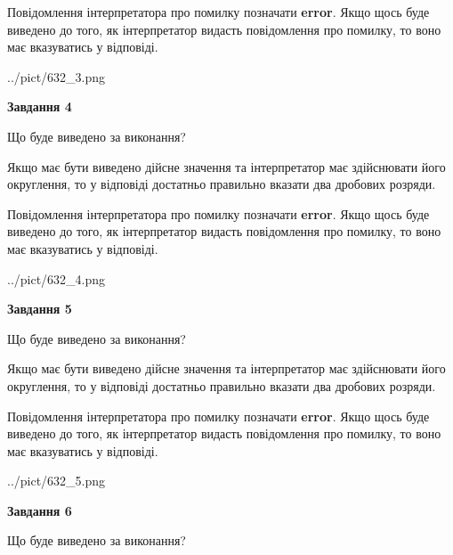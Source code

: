 \documentclass[12pt, ukrainian]{article}
\begin{document}
{\begin {Large}
Повідомлення інтерпретатора про помилку позначати \textbf{error}.
Якщо щось буде виведено до того, як інтерпретатор видасть повідомлення про помилку, 
то воно має вказуватись у відповіді. \par

\begin{center}
	{../pict/632_3.png}
\end{center}
\newpage

{\begin {center}\textbf{Завдання 4}\end {center}}\par
Що буде виведено за виконання? \par

Якщо має бути виведено дійсне значення та інтерпретатор має здійснювати його округлення, 
то у відповіді достатньо правильно вказати два дробових розряди.

Повідомлення інтерпретатора про помилку позначати \textbf{error}.
Якщо щось буде виведено до того, як інтерпретатор видасть повідомлення про помилку, 
то воно має вказуватись у відповіді. \par

\begin{center}
	{../pict/632_4.png}
\end{center}
\newpage

{\begin {center}\textbf{Завдання 5}\end {center}}\par
Що буде виведено за виконання? \par

Якщо має бути виведено дійсне значення та інтерпретатор має здійснювати його округлення, 
то у відповіді достатньо правильно вказати два дробових розряди.

Повідомлення інтерпретатора про помилку позначати \textbf{error}.
Якщо щось буде виведено до того, як інтерпретатор видасть повідомлення про помилку, 
то воно має вказуватись у відповіді. \par

\begin{center}
	{../pict/632_5.png}
\end{center}
\newpage

{\begin {center}\textbf{Завдання 6}\end {center}}\par
Що буде виведено за виконання? \par


\end{Large}}
\end{document}
